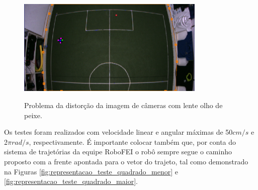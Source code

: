 \documentclass[acronym, symbols, table]{fei}
\begin{document}
		\begin{figure}[!htb]
			\centering
			\caption{Problema da distorção da imagem de câmeras com lente olho de peixe.}
			\includegraphics[width=0.80\textwidth]{problema_distorcao_1.png}
			\label{fig:problema_distorcao}
		\end{figure}
	
		Os testes foram realizados com velocidade linear e angular máximas de 50$cm/s$ e 2$\pi$$rad/s$, respectivamente. É importante colocar também que, por conta do sistema de trajetórias da equipe RoboFEI o robô sempre segue o caminho proposto com a frente apontada para o vetor do trajeto, tal como demonstrado na Figuras \ref{fig:representacao_teste_quadrado_menor} e \ref{fig:representacao_teste_quadrado_maior}.
		
\end{document}
